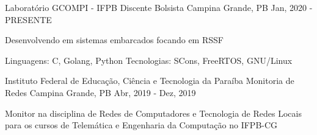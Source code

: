 
\begin{cventries}
  \cventry
    {Laboratório GCOMPI - IFPB} %
    {Discente Bolsista} %
    {Campina Grande, PB} %
    {Jan, 2020 - PRESENTE} %
    {
      \begin{cvitems} %
        \item {Desenvolvendo em sistemas embarcados focando em RSSF  }
        \item {Linguagens: C, Golang, Python \n Tecnologias: SCons, FreeRTOS, GNU/Linux}
      \end{cvitems}
    }
    
  \cventry
    {Instituto Federal de Educação, Ciência e Tecnologia da Paraíba}
    {Monitoria de Redes}
    {Campina Grande, PB}
    {Abr, 2019 - Dez, 2019}
    {
      \begin{cvitems}
        \item {Monitor na disciplina de Redes de Computadores e Tecnologia de Redes Locais para os cursos de Telemática e Engenharia da Computação no IFPB-CG}
      \end{cvitems}
    }
    
\end{cventries}
